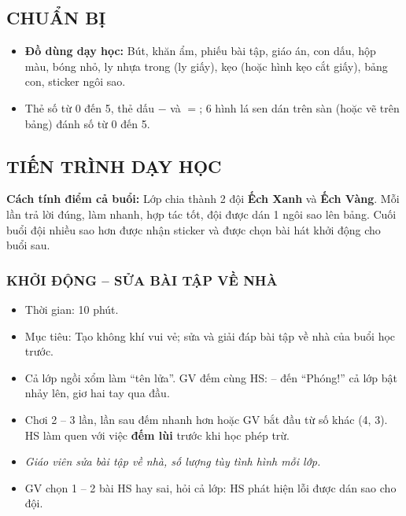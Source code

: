 \documentclass[../main.tex]{subfiles}
\begin{document}
\subsection{CHUẨN BỊ}
\begin{itemize}
    \item[-] \textbf{Đồ dùng dạy học:} Bút, khăn ẩm, phiếu bài tập, giáo án, con dấu, hộp màu, bóng nhỏ, ly nhựa trong (ly giấy), kẹo (hoặc hình kẹo cắt giấy), bảng con, sticker ngôi sao.
    \item[-] Thẻ số từ 0 đến 5, thẻ dấu \textbf{$-$} và \textbf{$=$}; 6 hình lá sen dán trên sàn (hoặc vẽ trên bảng) đánh số từ 0 đến 5.
\end{itemize}

\subsection{TIẾN TRÌNH DẠY HỌC}
\begin{luuy}
    \textbf{Cách tính điểm cả buổi:} Lớp chia thành 2 đội \textbf{Ếch Xanh} và \textbf{Ếch Vàng}. Mỗi lần trả lời đúng, làm nhanh, hợp tác tốt, đội được dán 1 ngôi sao lên bảng. Cuối buổi đội nhiều sao hơn được nhận sticker và được chọn bài hát khởi động cho buổi sau.
\end{luuy}

\subsubsection{KHỞI ĐỘNG -- SỬA BÀI TẬP VỀ NHÀ}
\begin{hd}
    \begin{itemize}
        \item Thời gian: 10 phút.
        \item Mục tiêu: Tạo không khí vui vẻ; sửa và giải đáp bài tập về nhà của buổi học trước.
    \end{itemize}
\end{hd}
\begin{itemize}
    \item[-] Cả lớp ngồi xổm làm “tên lửa”. GV đếm cùng HS:  -- đến “Phóng!” cả lớp bật nhảy lên, giơ hai tay qua đầu.
    \item[-] Chơi 2 -- 3 lần, lần sau đếm nhanh hơn hoặc GV bắt đầu từ số khác (4, 3). HS làm quen với việc \textbf{đếm lùi} trước khi học phép trừ.
\end{itemize}
\begin{itemize}
    \item[-] \textit{\color{red!80!black}Giáo viên sửa bài tập về nhà, số lượng tùy tình hình mỗi lớp.}
    \item[-] GV chọn 1 -- 2 bài HS hay sai, hỏi cả lớp:  HS phát hiện lỗi được dán sao cho đội.
\end{itemize}
\end{document}
